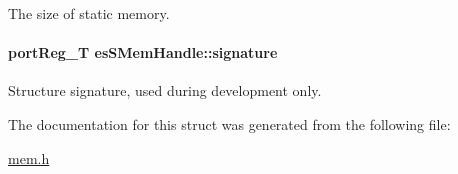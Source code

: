 The size of static memory. 

\hypertarget{structesSMemHandle_a026a8283657eb726a0c9c559e455153a}{
\paragraph[{signature}]{\setlength{\rightskip}{0pt plus 5cm}port\-Reg\-\_\-\-T es\-S\-Mem\-Handle\-::signature}}\label{structesSMemHandle_a026a8283657eb726a0c9c559e455153a}


Structure signature, used during development only. 



The documentation for this struct was generated from the following file\-:\begin{DoxyCompactItemize}
\item 
\hyperlink{mem_8h}{mem.\-h}\end{DoxyCompactItemize}
